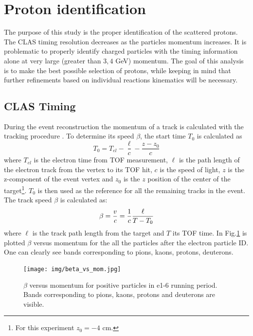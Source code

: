 \section{Proton identification}

The purpose of this study is the proper identification of the
scattered protons. The CLAS timing resolution decreases as the
particles momentum increases. It is problematic to properly identify
charged particles with the timing  information alone at very large (greater than $3, 4$ GeV) momentum.
The goal of this analysis is to make the best possible selection of protons, while keeping
in mind that further refinements based on individual reactions kinematics will be necessary.


\subsection{CLAS Timing}
\label{sec:clas_timing}


During the event reconstruction the momentum of a track is calculated 
with the tracking procedure \cite{bib:tracking}. To determine its speed $\beta$,
the start time $T_0$ is calculated as
\begin{equation}
 T_0 = T_{el} - \frac{\ell}{c} - \frac{z-z_0}{c}
\end{equation}
where $T_{el}$ is the electron time from TOF measurement, $\ell$ is the
path length of the electron track from the vertex to its TOF hit, $c$ is
the speed of light, $z$ is the z-component of the event vertex and $z_0$ 
is the $z$ position of the center of the 
target\footnote{For this experiment $z_0 = -4$ cm.}. $T_0$ is then used 
as the reference for all the remaining tracks in the event. The track speed $\beta$ 
is calculated as:
\begin{equation}
 \beta = \frac{v}{\it c} = \frac{1}{c} \frac{\ell}{T-T_0}
\end{equation}
where $\ell$ is the track path length from the target and $T$ its TOF time.
In  Fig.\ref{fig:beta_vs_mom} is plotted $\beta$ versus momentum for the all the 
particles after the electron particle ID. One can clearly see bands corresponding 
to pions, kaons, protons, deuterons.


\begin{figure}[h]
  \centering
		\texttt{[image: img/beta\_vs\_mom.jpg]}
		\caption{ $\beta$ versus momentum for positive particles in e1-6 running period. Bands
                    corresponding to pions, kaons, protons and deuterons are visible.}
 		\label{fig:beta_vs_mom}
\end{figure}

